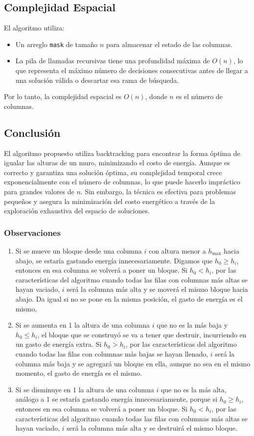 \documentclass[a4paper,12pt]{article}
\begin{document}
\subsection{Complejidad Espacial}
El algoritmo utiliza:
\begin{itemize}
	\item Un arreglo \texttt{mask} de tamaño \( n \) para almacenar el estado de las columnas.
	\item La pila de llamadas recursivas tiene una profundidad máxima de \( O(n) \), lo que representa el máximo número de decisiones consecutivas antes de llegar a una solución válida o descartar esa rama de búsqueda.
\end{itemize}
Por lo tanto, la complejidad espacial es \( O(n) \), donde \( n \) es el número de columnas.

\subsection{Conclusión}
El algoritmo propuesto utiliza backtracking para encontrar la forma óptima de igualar las alturas de un muro, minimizando el costo de energía. Aunque es correcto y garantiza una solución óptima, su complejidad temporal crece exponencialmente con el número de columnas, lo que puede hacerlo impráctico para grandes valores de \( n \). Sin embargo, la técnica es efectiva para problemas pequeños y asegura la minimización del costo energético a través de la exploración exhaustiva del espacio de soluciones.

\subsubsection{Observaciones}
\begin{enumerate}
	\item Si se mueve un bloque desde una columna \( i \) con altura menor a \( h_{\text{max}} \) hacia abajo, se estaría gastando energía innecesariamente. Digamos que \( h_0 \geq h_i \), entonces en esa columna se volverá a poner un bloque. Si \( h_0 < h_i \), por las características del algoritmo cuando todas las filas con columnas más altas se hayan vaciado, \( i \) será la columna más alta y se moverá el mismo bloque hacia abajo. Da igual si no se pone en la misma posición, el gasto de energía es el mismo.
	\item Si se aumenta en 1 la altura de una columna \( i \) que no es la más baja y \( h_0 \leq h_i \), el bloque que se construyó se va a tener que destruir, incurriendo en un gasto de energía extra. Si \( h_0 > h_i \), por las características del algoritmo cuando todas las filas con columnas más bajas se hayan llenado, \( i \) será la columna más baja y se agregará un bloque en ella, aunque no sea en el mismo momento, el gasto de energía es el mismo.
	\item Si se disminuye en 1 la altura de una columna \( i \) que no es la más alta, análogo a 1 se estaría gastando energía innecesariamente, porque si \( h_0 \geq h_i \), entonces en esa columna se volverá a poner un bloque. Si \( h_0 < h_i \), por las características del algoritmo cuando todas las filas con columnas más altas se hayan vaciado, \( i \) será la columna más alta y se destruirá el mismo bloque.
\end{enumerate}
\end{document}
